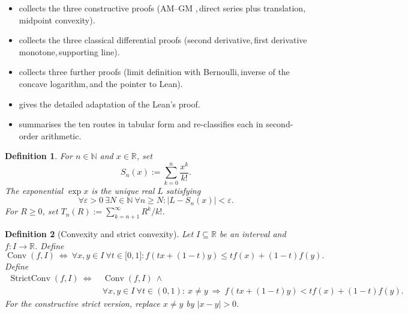 \documentclass[11pt,reqno]{amsart}
\providecommand{\func}[1]{\operatorname{#1}}
\theoremstyle{redplain}
\newtheorem{definition}{Definition}[section]
\providecommand{\comma}{,\,}
\numberwithin{equation}{section}
\begin{document}
\begin{itemize}
\item {} collects the three constructive proofs (AM--GM%
\comma direct series plus translation, midpoint convexity).

\item {} collects the three classical differential proofs
(second derivative\comma first derivative monotone\comma supporting line).

\item {} collects three further proofs (limit definition
with Bernoulli\comma inverse of the concave logarithm\comma and the pointer
to Lean).

\item {} gives the detailed adaptation of the Lean's proof.

\item {} summarises the ten routes in tabular form and
re-classifies each in second-order arithmetic.
\end{itemize}

\begin{definition}
For $n\in \mathbb{N}$ and $x\in \mathbb{R}$, set 
\begin{equation}
S_{n}(x):=\sum_{k=0}^{n}\frac{x^{k}}{k!}.
\end{equation}%
The exponential $\exp x$ is the unique real $L$ satisfying 
\begin{equation}
\forall \varepsilon >0\ \exists N\in \mathbb{N}\ \forall n\geq
N:|L-S_{n}(x)|<\varepsilon .
\end{equation}%
For $R\geq 0$, set $T_{n}(R):=\sum_{k=n+1}^{\infty }R^{k}/k!$.
\end{definition}

\begin{definition}[Convexity and strict convexity]
Let $I\subseteq \mathbb{R}$ be an interval and $f:I\rightarrow \mathbb{R}$.
Define 
\begin{equation}
\func{Conv}(f,I)\ \Longleftrightarrow \ \forall x,y\in I\ \forall t\in
\lbrack 0,1]:f(tx+(1-t)y)\leq tf(x)+(1-t)f(y).
\end{equation}%
Define 
\begin{equation*}
\begin{aligned} \operatorname{StrictConv}(f,I)\ \Longleftrightarrow\ 
&\operatorname{Conv}(f,I)\ \wedge\\ &\forall x,y\in I\ \forall t\in(0,1):\
x\ne y\ \Longrightarrow\ f(tx+(1-t)y)<tf(x)+(1-t)f(y). \end{aligned}
\end{equation*}%
For the constructive strict version, replace $x\neq y$ by $|x-y|>0$.
\end{definition}
\end{document}

